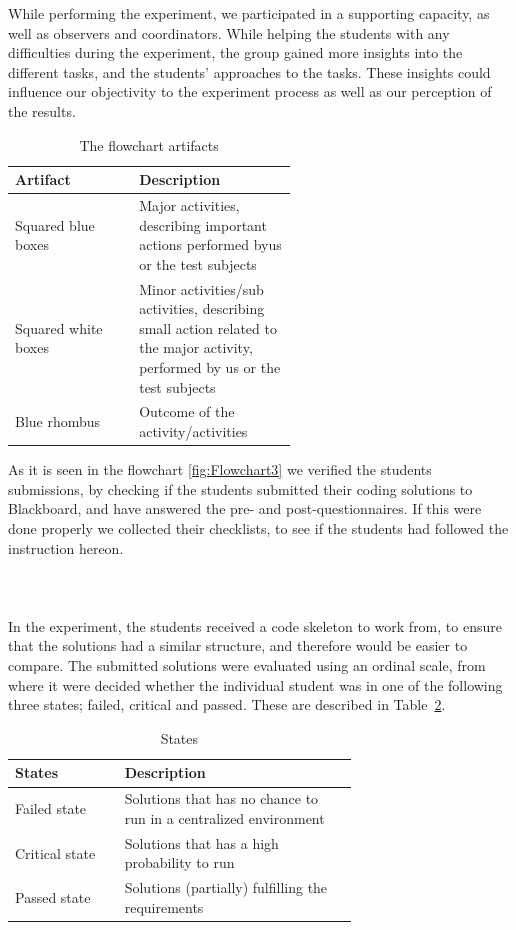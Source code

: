 \documentclass{sig-alternate-05-2015}
\begin{document}
While performing the experiment, we participated in a supporting capacity, as well as observers and coordinators. While helping the students with any difficulties during the experiment, the group gained more insights into the different tasks, and the students' approaches to the tasks. These insights could influence our objectivity to the experiment process as well as our perception of the results.\\
\begin{table}[!ht]
\centering
\caption{The flowchart artifacts}
\label{tab:The flowchart artifacts:}
\begin{tabular}{|l|p{0.56\linewidth}|}
\hline
\textbf{Artifact} & \textbf{Description} \\
\hline
\hline
Squared blue boxes & Major activities, describing important actions performed byus or the test subjects\\
Squared white boxes & Minor activities/sub activities, describing small action related to the major activity, performed by us or the test subjects\\
Blue rhombus & Outcome of the activity/activities\\
\hline
\end{tabular}
\end{table}

As it is seen in the flowchart \ref{fig:Flowchart3} we verified the students submissions, by checking if the students submitted their coding solutions to Blackboard, and have answered the pre- and post-questionnaires. If this were done properly we collected their checklists, to see if the students had followed the instruction hereon.\\\\\\\\

In the experiment, the students received a code skeleton to work from, to ensure that the solutions had a similar structure, and therefore would be easier to compare. The submitted solutions were evaluated using an ordinal scale, from where it were decided whether the individual student was in one of the following three states; failed, critical and passed. These are described in Table~\ref{StatesTable}.

\begin{table}[!ht]
\centering
\caption{States}
\label{StatesTable}
\begin{tabular}{|l|p{0.68\linewidth}|}
\hline
\textbf{States} & \textbf{Description} \\
\hline
\hline
Failed state & Solutions that has no chance to run in a centralized environment \\
Critical state & Solutions that has a high probability to run \\
Passed state & Solutions (partially) fulfilling the requirements \\
\hline
\end{tabular}
\end{table}
\end{document}
